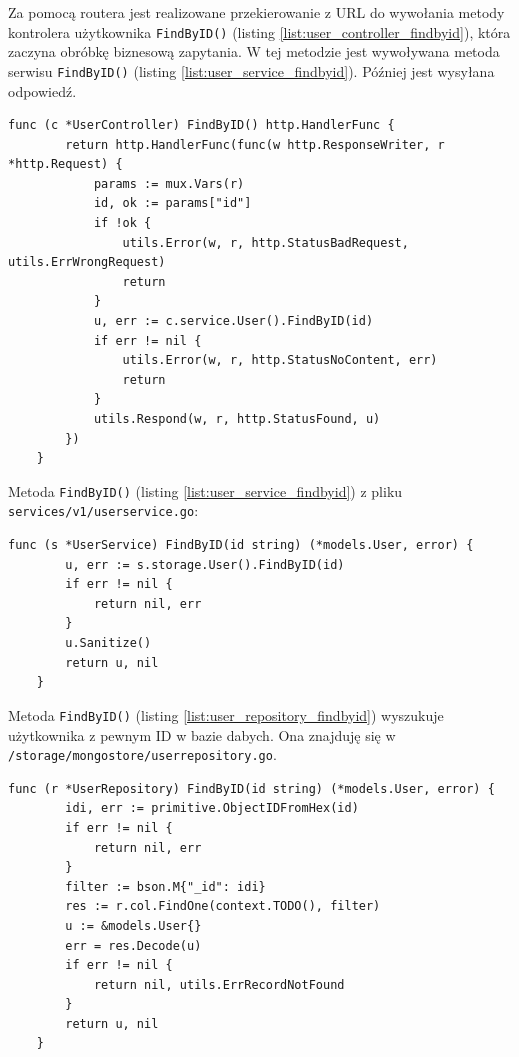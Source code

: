 Za pomocą routera jest realizowane przekierowanie z URL do wywołania metody kontrolera użytkownika \texttt{FindByID()} (listing \ref{list:user_controller_findbyid}), która zaczyna obróbkę biznesową zapytania.
W tej metodzie jest wywoływana metoda serwisu \texttt{FindByID()} (listing \ref{list:user_service_findbyid}). Później jest wysyłana odpowiedź.
\begin{lstlisting}[label=list:user_controller_findbyid,caption=Kontroler wczytywania użytkownika,basicstyle=\tiny\ttfamily]
    func (c *UserController) FindByID() http.HandlerFunc {
        return http.HandlerFunc(func(w http.ResponseWriter, r *http.Request) {
            params := mux.Vars(r)
            id, ok := params["id"]
            if !ok {
                utils.Error(w, r, http.StatusBadRequest, utils.ErrWrongRequest)
                return
            }
            u, err := c.service.User().FindByID(id)
            if err != nil {
                utils.Error(w, r, http.StatusNoContent, err)
                return
            }
            utils.Respond(w, r, http.StatusFound, u)
        })
    }
\end{lstlisting}
% 
Metoda \texttt{FindByID()} (listing \ref{list:user_service_findbyid}) z pliku \texttt{services/v1/userservice.go}:
\begin{lstlisting}[label=list:user_service_findbyid,caption=Serwis wczytywania użytkownika,basicstyle=\tiny\ttfamily]
    func (s *UserService) FindByID(id string) (*models.User, error) {
        u, err := s.storage.User().FindByID(id)
        if err != nil {
            return nil, err
        }
        u.Sanitize()
        return u, nil
    }
\end{lstlisting}
% 
Metoda \texttt{FindByID()} (listing \ref{list:user_repository_findbyid}) wyszukuje użytkownika z pewnym ID w bazie dabych.
Ona znajduję się w \texttt{/storage/mongostore/userrepository.go}.
\begin{lstlisting}[label=list:user_repository_findbyid,caption=Wczytywanie uzytkownika z bazy danych,basicstyle=\tiny\ttfamily]
    func (r *UserRepository) FindByID(id string) (*models.User, error) {
        idi, err := primitive.ObjectIDFromHex(id)
        if err != nil {
            return nil, err
        }
        filter := bson.M{"_id": idi}
        res := r.col.FindOne(context.TODO(), filter)
        u := &models.User{}
        err = res.Decode(u)
        if err != nil {
            return nil, utils.ErrRecordNotFound
        }
        return u, nil
    }
\end{lstlisting}

